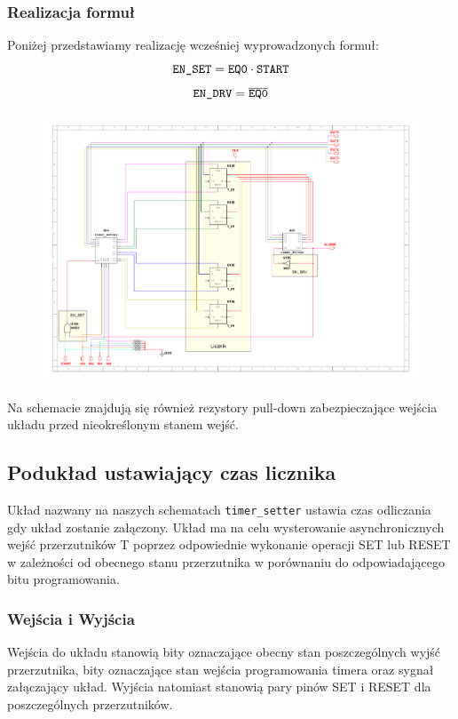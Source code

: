 \documentclass[a4paper]{article}
\begin{document}
\pagebreak
\subsubsection{Realizacja formuł}
Poniżej przedstawiamy realizację wcześniej wyprowadzonych formuł:
\[ \verb|EN_SET| = \verb|EQ0| \cdot \verb|START|  \] 
\[ \verb|EN_DRV| = \overline{\texttt{EQ0}} \]
\begin{figure}[H]
    \centering
    \includegraphics[width=\textwidth]{timer_subsheet.pdf}
\end{figure}
Na schemacie znajdują się również rezystory pull-down zabezpieczające wejścia układu przed 
nieokreślonym stanem wejść.

\pagebreak
\subsection{Podukład ustawiający czas licznika}
Układ nazwany na naszych schematach \verb|timer_setter| ustawia czas odliczania 
gdy układ zostanie załączony. Układ ma na celu wysterowanie asynchronicznych wejść przerzutników T
poprzez odpowiednie wykonanie operacji SET lub RESET w zależności od obecnego stanu przerzutnika w 
porównaniu do odpowiadającego bitu programowania.

\subsubsection{Wejścia i Wyjścia}
Wejścia do układu stanowią bity oznaczające obecny stan poszczególnych wyjść przerzutnika, bity
oznaczające stan wejścia programowania timera oraz sygnał załączający układ. Wyjścia natomiast 
stanowią pary pinów SET i RESET dla poszczególnych przerzutników. 
\end{document}
